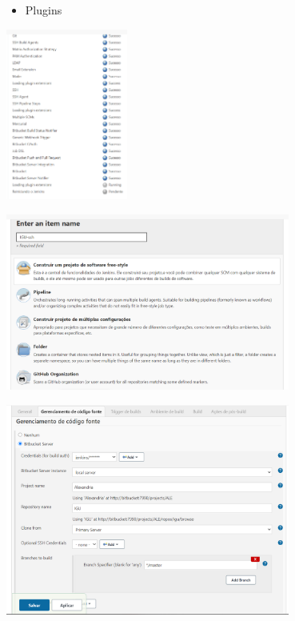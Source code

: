 \documentclass[10pt]{beamer}
\theoremstyle{remark}
\theoremstyle{definition}
\begin{document}
\begin{frame}[allowframebreaks]
	\framebreak
	
	\begin{itemize}
		\item 	Plugins
	\end{itemize}
	
	\begin{center}
		\includegraphics[width=0.3\textwidth]{images/44.png}
	\end{center}
	
	\framebreak
	
	\begin{center}
		\includegraphics[width=0.7\textwidth]{images/45.png}
	\end{center}
	
	\framebreak
	
	\begin{center}
		\includegraphics[width=0.7\textwidth]{images/46.png}
	\end{center}
	

\end{frame}
\end{document}
